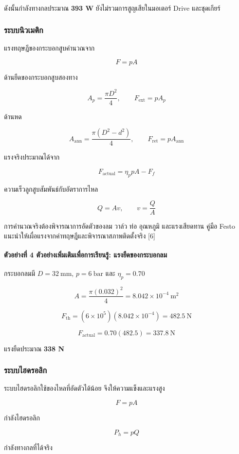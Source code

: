 ดังนั้นกำลังทางกลประมาณ \textbf{393 W} ยังไม่รวมการสูญเสียในมอเตอร์ Drive และชุดเกียร์

\subsubsection{ระบบนิวเมติก}

แรงทฤษฎีของกระบอกสูบคำนวณจาก

\[
F=pA
\]

ด้านยืดของกระบอกสูบสองทาง

\[
A_p=\frac{\pi D^2}{4},
\qquad
F_{\text{ext}}=pA_p
\]

ด้านหด

\[
A_{\text{ann}}=\frac{\pi(D^2-d^2)}{4},
\qquad
F_{\text{ret}}=pA_{\text{ann}}
\]

แรงจริงประมาณได้จาก

\[
F_{\text{actual}}=\eta_p pA-F_f
\]

ความเร็วลูกสูบสัมพันธ์กับอัตราการไหล

\[
Q=Av,
\qquad
v=\frac{Q}{A}
\]

การคำนวณจริงต้องพิจารณาการอัดตัวของลม วาล์ว ท่อ อุณหภูมิ และแรงเสียดทาน คู่มือ Festo แนะนำให้เผื่อแรงจากค่าทฤษฎีและพิจารณาสภาพติดตั้งจริง [6]

\paragraph{ตัวอย่างที่ 4 ตัวอย่างเพิ่มเติมเพื่อการเรียนรู้: แรงยืดของกระบอกลม}

กระบอกลมมี $D=32\ \text{mm}$, $p=6\ \text{bar}$ และ $\eta_p=0.70$

\[
A=\frac{\pi(0.032)^2}{4}=8.042\times10^{-4}\ \text{m}^2
\]

\[
F_{\text{th}}=(6\times10^5)(8.042\times10^{-4})=482.5\ \text{N}
\]

\[
F_{\text{actual}}=0.70(482.5)=337.8\ \text{N}
\]

แรงยืดประมาณ \textbf{338 N}

\subsubsection{ระบบไฮดรอลิก}

ระบบไฮดรอลิกใช้ของไหลที่อัดตัวได้น้อย จึงให้ความแข็งและแรงสูง

\[
F=pA
\]

กำลังไฮดรอลิก

\[
P_h=pQ
\]

กำลังทางกลที่ได้จริง

